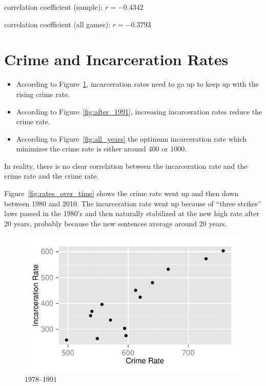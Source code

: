 \documentclass[landscape]{exam}
\begin{document}
  \begin{itemize*}
    \item correlation coefficient (sample): $r = -0.4342$
    \item correlation coefficient (all games): $r = -0.3793$
  \end{itemize*}

  \section{Crime and Incarceration Rates}

  \begin{itemize}
    \item According to Figure~\ref{fig:before_1991}, incarceration rates need to
      go up to keep up with the rising crime rate.

    \item According to Figure~\ref{fig:after_1991}, increasing incarceration rates 
      reduce the crime rate.

    \item According to Figure~\ref{fig:all_years} the optimum incarceration rate
      which minimizes the crime rate is either around 400 or 1000. 
      
  \end{itemize}

  In reality, there is no clear correlation between the incarceration rate and
  the crime rate and the crime rate.

  Figure~\ref{fig:rates_over_time} shows the crime rate went up and then down
  between 1980 and 2010. The incarceration rate went up because of ``three
  strikes'' laws passed in the 1980's and then naturally stabilized at the new
  high rate after 20 years, probably because the new sentences average around 20
  years.

  \begin{figure}[H]
    \centering
    \includegraphics{figures/crime/crime_vs_incarceration_before_1991.pdf}
    \caption{1978--1991}\label{fig:before_1991}
  \end{figure}
\end{document}
